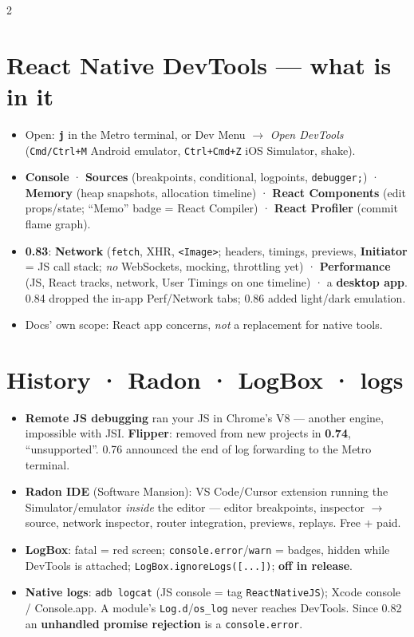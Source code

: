 \documentclass[8pt]{extarticle}
\begin{document}
\begin{multicols}{2}
\raggedright

\section{React Native DevTools — what is in it}
\begin{itemize}\raggedright
  \item Open: \textbf{\texttt{j}} in the Metro terminal, or Dev Menu $\to$ \emph{Open DevTools}
        (\texttt{Cmd/Ctrl+M} Android emulator, \texttt{Ctrl+Cmd+Z} iOS Simulator, shake).
  \item \textbf{Console} · \textbf{Sources} (breakpoints, conditional, logpoints,
        \texttt{debugger;}) · \textbf{Memory} (heap snapshots, allocation timeline) ·
        \textbf{React Components} (edit props/state; ``Memo'' badge = React Compiler) ·
        \textbf{React Profiler} (commit flame graph).
  \item \textbf{0.83}: \textbf{Network} (\texttt{fetch}, XHR, \texttt{<Image>}; headers,
        timings, previews, \textbf{Initiator} = JS call stack; \emph{no} WebSockets, mocking,
        throttling yet) · \textbf{Performance} (JS, React tracks, network, User Timings on one
        timeline) · a \textbf{desktop app}. 0.84 dropped the in-app Perf/Network tabs;
        0.86 added light/dark emulation.
  \item Docs' own scope: React app concerns, \emph{not} a replacement for native tools.
\end{itemize}

\section{History · Radon · LogBox · logs}
\begin{itemize}\raggedright
  \item \textbf{Remote JS debugging} ran your JS in Chrome's V8 — another engine,
        impossible with JSI. \textbf{Flipper}: removed from new projects in \textbf{0.74},
        ``unsupported''. 0.76 announced the end of log forwarding to the Metro terminal.
  \item \textbf{Radon IDE} (Software Mansion): VS Code/Cursor extension running the
        Simulator/emulator \emph{inside} the editor — editor breakpoints, inspector $\to$
        source, network inspector, router integration, previews, replays. Free + paid.
  \item \textbf{LogBox}: fatal = red screen; \texttt{console.error}/\texttt{warn} = badges,
        hidden while DevTools is attached; \texttt{LogBox.ignoreLogs([...])}; \textbf{off in release}.
  \item \textbf{Native logs}: \texttt{adb logcat} (JS console = tag \texttt{ReactNativeJS});
        Xcode console / Console.app. A module's \texttt{Log.d}/\texttt{os\_log} never reaches
        DevTools. Since 0.82 an \textbf{unhandled promise rejection} is a \texttt{console.error}.
\end{itemize}


\end{multicols}
\end{document}
